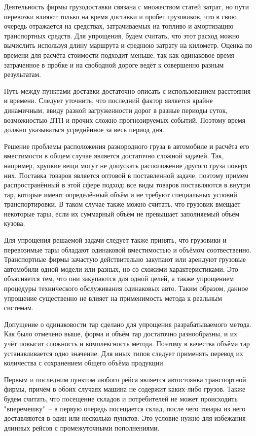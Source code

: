 	Деятельность фирмы грузодоставки связана с множеством статей затрат, но пути перевозки влияют только на время доставки и пробег грузовиков, что в свою очередь отражается на средствах, затрачиваемых на топливо и амортизацию транспортных средств. Для упрощения, будем считать, что этот расход можно вычислить используя длину маршрута и среднюю затрату на километр. Оценка по времени для расчёта стоимости подходит меньше, так как одинаковое время затраченное в пробке и на свободной дороге ведёт к совершенно разным результатам.
	
	Путь между пунктами доставки достаточно описать с использованием расстояния и времени. Следует уточнить, что последний фактор является крайне динамичным, ввиду разной загруженности дорог в разные периоды суток, возможностью ДТП и прочих сложно прогнозируемых событий. Поэтому время должно указываться  усреднённое за весь период дня.
	
	Решение проблемы расположения разнородного груза в автомобиле и расчёта его вместимости в общем случае является достаточно сложной задачей. Так, например, хрупкие вещи могут не допускать расположение другого груза поверх них. Поставка товаров является оптовой в поставленной задаче, поэтому примем распространённый в этой сфере подход: все виды товаров поставляются в внутри тар, которые имеют определённый объём и не требуют специальных условий транспортировки. В таком случае также можно считать, что грузовик вмещает некоторые тары, если их суммарный объём не превышает заполняемый объём кузова.
	
	Для упрощения решаемой задачи следует также принять, что грузовики и перевозимые тары обладают одинаковой вместимостью и объёмом соотвественно. Транспортные фирмы зачастую действительно закупают или арендуют грузовые автомобили одной модели или разных, но со схожими характеристиками. Это объясняется тем, что они закупаются для одной целей, а также упрощением процедуры технического обслуживания одинаковых авто. Таким образом, данное упрощение существенно не влияет на применимость метода к реальным системам.
	
	Допущение о одинаковости тар сделано для упрощения разрабатываемого метода. Как было отмечено выше, форма и объём тар достаточно разнообразны, и их учёт повысит сложность и комплексность метода. Поэтому в качества объёма тар устанавливается одно значение. Для иных типов следует применять перевод их количества с сохранением общего объёма продукции. 
	
	Первым и последним пунктом любого рейса является автостоянка транспортной фирмы, причём в обоих случаях машина не содержит каких-либо грузов. Также будем считать, что посещение складов и потребителей не может происходить "вперемешку"\ -- в первую очередь посещается склад, после чего товары из него доставляются в один или несколько пунктов. Это условие нужно для избежания длинных рейсов с промежуточными пополнениями.

